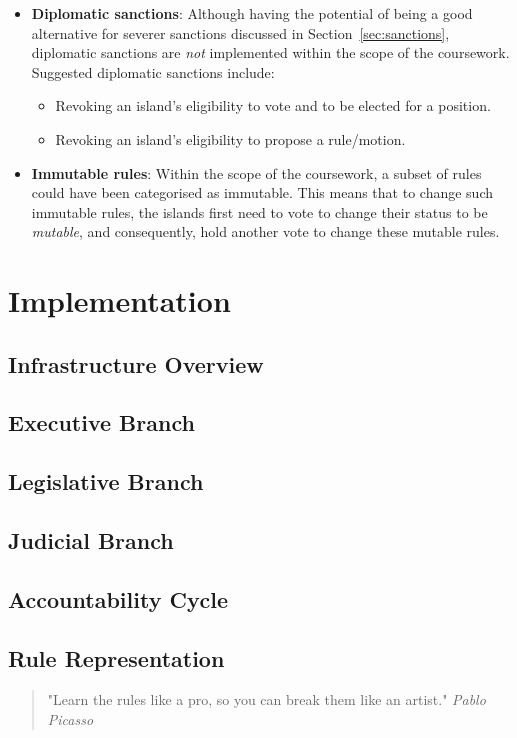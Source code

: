 \begin{itemize}
    \item \textbf{Diplomatic sanctions}: Although having the potential of being a good alternative for severer sanctions discussed in  Section~\ref{sec:sanctions}, diplomatic sanctions are \emph{not} implemented within the scope of the coursework. \\
    Suggested diplomatic sanctions include:
        \begin{itemize}
            \item Revoking an island's eligibility to vote and to be elected for a position.
            \item Revoking an island's eligibility to propose a rule/motion.
        \end{itemize}
    \item \textbf{Immutable rules}: Within the scope of the coursework, a subset of rules could have been categorised as immutable. This means that to change such immutable rules, the islands first need to vote to change their status to be \emph{mutable}, and consequently, hold another vote to change these mutable rules.
\end{itemize}


\section{Implementation} %
\subsection{Infrastructure Overview}
\subsection{Executive Branch}
\subsection{Legislative Branch}
\subsection{Judicial Branch}
\subsection{Accountability Cycle}
\subsection{Rule Representation}
\begin{quote}
    "Learn the rules like a pro, so you can break them like an artist."
    \linebreak
    \noindent \emph{Pablo Picasso}
\end{quote}

